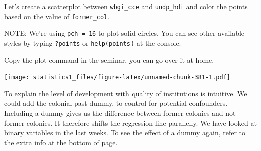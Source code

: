 \documentclass[]{article}
\newenvironment{Shaded}{\begin{snugshade}}{\end{snugshade}}
\newcommand{\KeywordTok}[1]{\textcolor[rgb]{0.13,0.29,0.53}{\textbf{#1}}}
\newcommand{\DataTypeTok}[1]{\textcolor[rgb]{0.13,0.29,0.53}{#1}}
\newcommand{\DecValTok}[1]{\textcolor[rgb]{0.00,0.00,0.81}{#1}}
\newcommand{\FloatTok}[1]{\textcolor[rgb]{0.00,0.00,0.81}{#1}}
\newcommand{\StringTok}[1]{\textcolor[rgb]{0.31,0.60,0.02}{#1}}
\newcommand{\CommentTok}[1]{\textcolor[rgb]{0.56,0.35,0.01}{\textit{#1}}}
\newcommand{\OperatorTok}[1]{\textcolor[rgb]{0.81,0.36,0.00}{\textbf{#1}}}
\newcommand{\NormalTok}[1]{#1}
\theoremstyle{definition}
\theoremstyle{definition}
\theoremstyle{definition}
\theoremstyle{remark}
\begin{document}
Let's create a scatterplot between \texttt{wbgi\_cce} and
\texttt{undp\_hdi} and color the points based on the value of
\texttt{former\_col}.

NOTE: We're using \texttt{pch\ =\ 16} to plot solid circles. You can see
other available styles by typing \texttt{?points} or
\texttt{help(points)} at the console.

Copy the plot command in the seminar, you can go over it at home.

\begin{Shaded}
\end{Shaded}

\texttt{[image: statistics1\_files/figure-latex/unnamed-chunk-381-1.pdf]}

To explain the level of development with quality of institutions is
intuitive. We could add the colonial past dummy, to control for
potential confounders. Including a dummy gives us the difference between
former colonies and not former colonies. It therefore shifts the
regression line parallelly. We have looked at binary variables in the
last weeks. To see the effect of a dummy again, refer to the extra info
at the bottom of page.
\end{document}
